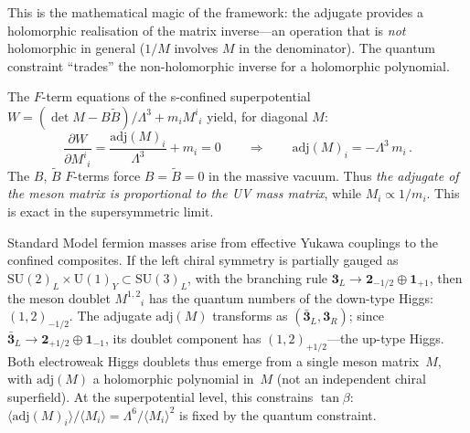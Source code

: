 \documentclass[12pt,a4paper]{article}
\newcommand{\SU}{\mathrm{SU}}
\newcommand{\UU}{\mathrm{U}}
\newcommand{\adj}{\mathrm{adj}}
\begin{document}
This is the mathematical magic of the framework: the adjugate
provides a holomorphic realisation of the matrix inverse---an
operation that is \emph{not} holomorphic in general ($1/M$ involves
$M$ in the denominator). The quantum constraint ``trades'' the
non-holomorphic inverse for a holomorphic polynomial.

The $F$-term equations of the s-confined superpotential
$W = (\det M - B\tilde B)/\Lambda^3 + m_i M^i{}_i$ yield, for
diagonal $M$:
\begin{equation}
  \frac{\partial W}{\partial M^i{}_i}
  = \frac{\adj(M)_i}{\Lambda^3} + m_i = 0
  \qquad\Longrightarrow\qquad
  \adj(M)_i = -\Lambda^3\,m_i\,.
  \label{eq:Fterm}
\end{equation}
The $B$, $\tilde B$ $F$-terms force $B = \tilde B = 0$ in the massive
vacuum. Thus \emph{the adjugate of the meson matrix is proportional to
the UV mass matrix}, while $M_i \propto 1/m_i$. This is exact in the
supersymmetric limit.

Standard Model fermion masses arise from effective Yukawa couplings
to the confined composites. If the left chiral symmetry is partially
gauged as $\SU(2)_L \times \UU(1)_Y \subset \SU(3)_L$, with the
branching rule $\mathbf{3}_L \to \mathbf{2}_{-1/2} \oplus
\mathbf{1}_{+1}$, then the meson doublet $M^{1,2}{}_i$ has the
quantum numbers of the down-type Higgs: $(1,2)_{-1/2}$. The adjugate
$\adj(M)$ transforms as $(\bar{\mathbf{3}}_L, \mathbf{3}_R)$; since
$\bar{\mathbf{3}}_L \to \mathbf{2}_{+1/2} \oplus
\mathbf{1}_{-1}$, its doublet component has $(1,2)_{+1/2}$---the
up-type Higgs. Both electroweak Higgs doublets thus emerge from a
single meson matrix~$M$, with $\adj(M)$ a holomorphic polynomial in~$M$
(not an independent chiral superfield). At the superpotential level,
this constrains $\tan\beta$: $\langle\adj(M)_i\rangle/\langle M_i\rangle
= \Lambda^6/\langle M_i\rangle^2$ is fixed by the quantum constraint.
\end{document}
